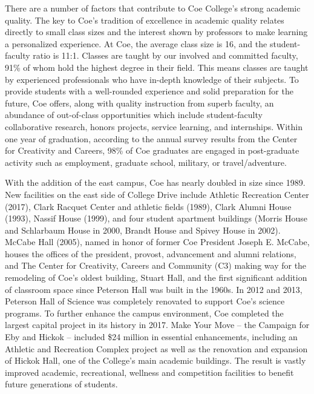 \documentclass[
  letterpaper,
]{scrbook}
\renewcommand{\part}[1]{\addcontentsline{toc}{part}{#1}}
\begin{document}
There are a number of factors that contribute to Coe College's strong
academic quality. The key to Coe's tradition of excellence in academic
quality relates directly to small class sizes and the interest shown by
professors to make learning a personalized experience. At Coe, the
average class size is 16, and the student-faculty ratio is 11:1. Classes
are taught by our involved and committed faculty, 91\% of whom hold the
highest degree in their field. This means classes are taught by
experienced professionals who have in-depth knowledge of their subjects.
To provide students with a well-rounded experience and solid preparation
for the future, Coe offers, along with quality instruction from superb
faculty, an abundance of out-of-class opportunities which include
student-faculty collaborative research, honors projects, service
learning, and internships. Within one year of graduation, according to
the annual survey results from the Center for Creativity and Careers,
98\% of Coe graduates are engaged in post-graduate activity such as
employment, graduate school, military, or travel/adventure.

With the addition of the east campus, Coe has nearly doubled in size
since 1989. New facilities on the east side of College Drive include
Athletic Recreation Center (2017), Clark Racquet Center and athletic
fields (1989), Clark Alumni House (1993), Nassif House (1999), and four
student apartment buildings (Morris House and Schlarbaum House in 2000,
Brandt House and Spivey House in 2002). McCabe Hall (2005), named in
honor of former Coe President Joseph E. McCabe, houses the offices of
the president, provost, advancement and alumni relations, and The Center
for Creativity, Careers and Community (C3) making way for the remodeling
of Coe's oldest building, Stuart Hall, and the first significant
addition of classroom space since Peterson Hall was built in the 1960s.
In 2012 and 2013, Peterson Hall of Science was completely renovated to
support Coe's science programs. To further enhance the campus
environment, Coe completed the largest capital project in its history in
2017. Make Your Move -- the Campaign for Eby and Hickok -- included \$24
million in essential enhancements, including an Athletic and Recreation
Complex project as well as the renovation and expansion of Hickok Hall,
one of the College's main academic buildings. The result is vastly
improved academic, recreational, wellness and competition facilities to
benefit future generations of students.

\part{ACADEMIC RESOURCES}
\end{document}

